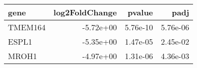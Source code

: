 \begin{tabular}{lrrr}
\toprule
   gene &  log2FoldChange &   pvalue &     padj \\
\midrule
TMEM164 &       -5.72e+00 & 5.76e-10 & 5.76e-06 \\
  ESPL1 &       -5.35e+00 & 1.47e-05 & 2.45e-02 \\
  MROH1 &       -4.97e+00 & 1.31e-06 & 4.36e-03 \\
\bottomrule
\end{tabular}
